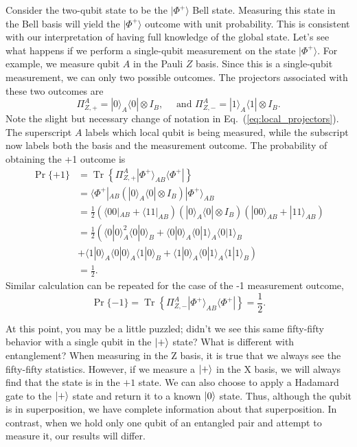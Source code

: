 Consider the two-qubit state to be the $|\Phi^+\rangle$ Bell state.
Measuring this state in the Bell basis will yield the $|\Phi^+\rangle$ outcome with unit probability.
This is consistent with our interpretation of having full knowledge of the global state.
Let's see what happens if we perform a single-qubit measurement on the state $|\Phi^+\rangle$.
For example, we measure qubit $A$ in the Pauli $Z$ basis.
Since this is a single-qubit measurement, we can only two possible outcomes.
The projectors associated with these two outcomes are
\begin{equation}
    \Pi^A_{Z,+} = |0\rangle_A\langle0| \otimes I_B, \quad \text{ and } \Pi^A_{Z,-} = |1\rangle_A\langle1| \otimes I_B.
    \label{eq:local_projectors}
\end{equation}
Note the slight but necessary change of notation in Eq.~(\ref{eq:local_projectors}).
The superscript $A$ labels which local qubit is being measured, while the subscript now labels both the basis and the measurement outcome.
The probability of obtaining the +1 outcome is
\begin{align}
    \operatorname{Pr}\{+1\} & = \operatorname{Tr}\left\{\Pi^A_{Z,+} |\Phi^+\rangle_{AB}\langle\Phi^+|\right\} \\
    & = \langle\Phi^+|_{AB} \left( |0\rangle_A\langle0| \otimes I_B \right) |\Phi^+\rangle_{AB} \nonumber\\
    & = \frac{1}{2} \left( \langle00|_{AB} + \langle11|_{AB} \right) \left( |0\rangle_A\langle0| \otimes I_B \right) \left( |00\rangle_{AB} + |11\rangle_{AB} \right) \nonumber\\
    & = \frac{1}{2} \left( \langle0|0\rangle_A^2 \langle0|0\rangle_B + \langle0|0\rangle_A \langle0|1\rangle_A \langle0|1\rangle_B \right. \nonumber\\
    & + \left. \langle1|0\rangle_A \langle0|0\rangle_A \langle1|0\rangle_B + \langle1|0\rangle_A \langle0|1\rangle_A \langle1|1\rangle_B \right) \nonumber\\
    & = \frac{1}{2}. \nonumber
\end{align}
Similar calculation can be repeated for the case of the -1 measurement outcome,
\begin{equation}
    \operatorname{Pr}\{-1\} = \operatorname{Tr}\left\{\Pi^A_{Z,-} |\Phi^+\rangle_{AB}\langle\Phi^+|\right\} = \frac{1}{2}.
\end{equation}

\label{page:plus-is-pure}
At this point, you may be a little puzzled; didn't we see this same fifty-fifty behavior with a single qubit in the $\left| + \right\rangle$ state?  What is different with entanglement?  When measuring in the Z basis, it is true that we always see the fifty-fifty statistics.  However, if we measure a $\left| + \right\rangle$ in the X basis, we will always find that the state is in the $+1$ state.  We can also choose to apply a Hadamard gate to the $\left| + \right\rangle$ state and return it to a known $\left| 0 \right\rangle$ state.  Thus, although the qubit is in superposition, we have complete information about that superposition.  In contrast, when we hold only one qubit of an entangled pair and attempt to measure it, our results will differ.

